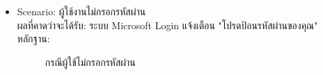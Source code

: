 \documentclass[14pt,oneside,openright,a4paper]{cpe-thai-project}
\begin{document}
\begin{itemize}
  \item Scenario: ผู้ใช้งานไม่กรอกรหัสผ่าน
  \\ผลที่คาดว่าจะได้รับ: ระบบ Microsoft Login แจ้งเตือน "โปรดป้อนรหัสผ่านของคุณ"
  \\หลักฐาน:\\
  \begin{figure}[!h]\centering
    \setlength{\fboxrule}{0.5mm} %
    \setlength{\fboxsep}{0.5cm}
    \caption{กรณีผู้ใช้ไม่กรอกรหัสผ่าน}\label{fig:LoginPageTest}
  \end{figure}
\end{itemize}

\newpage
\end{document}
